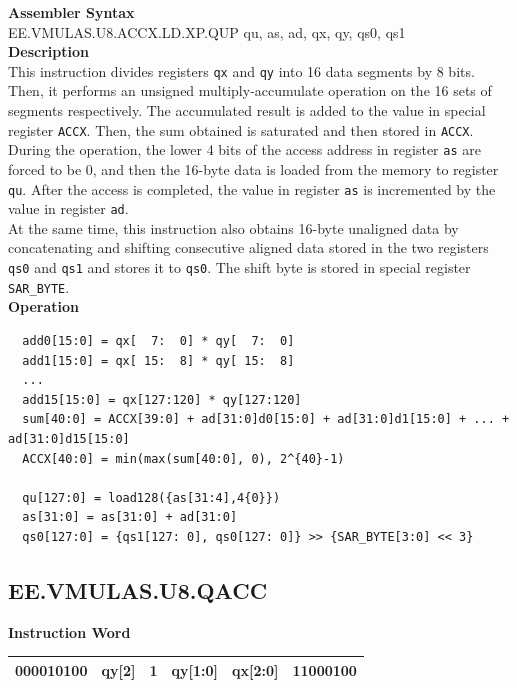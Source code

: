 \textbf{Assembler Syntax} \\
EE.VMULAS.U8.ACCX.LD.XP.QUP qu, as, ad, qx, qy, qs0, qs1 \\
\textbf{Description} \\
This instruction divides registers \lstinline{qx} and \lstinline{qy} into 16 data segments by 8 bits. Then, it performs an unsigned multiply-accumulate operation on the 16 sets of segments respectively. The accumulated result is added to the value in special register \lstinline{ACCX}. Then, the sum obtained is saturated and then stored in \lstinline{ACCX}.\\
During the operation, the lower 4 bits of the access address in register \lstinline{as} are forced to be 0, and then the 16-byte data is loaded from the memory to register \lstinline{qu}. After the access is completed, the value in register \lstinline{as} is incremented by the value in register \lstinline{ad}.\\
At the same time, this instruction also obtains 16-byte unaligned data by concatenating and shifting consecutive aligned data stored in the two registers \lstinline{qs0} and \lstinline{qs1} and stores it to \lstinline{qs0}. The shift byte is stored in special register \lstinline{SAR_BYTE}.\\
\textbf{Operation}
\begin{lstlisting}
  add0[15:0] = qx[  7:  0] * qy[  7:  0]
  add1[15:0] = qx[ 15:  8] * qy[ 15:  8]
  ...
  add15[15:0] = qx[127:120] * qy[127:120]
  sum[40:0] = ACCX[39:0] + ad[31:0]d0[15:0] + ad[31:0]d1[15:0] + ... + ad[31:0]d15[15:0]
  ACCX[40:0] = min(max(sum[40:0], 0), 2^{40}-1)

  qu[127:0] = load128({as[31:4],4{0}})
  as[31:0] = as[31:0] + ad[31:0]
  qs0[127:0] = {qs1[127: 0], qs0[127: 0]} >> {SAR_BYTE[3:0] << 3}
\end{lstlisting}

\clearpage
\subsection{EE.VMULAS.U8.QACC}\label{instruction:EEVMULASU8QACC}
\setlength\tabcolsep{6pt}
\textbf{Instruction Word} \\
\begin{tabular}{|c|c|c|c|c|c|}
	\hline
	000010100 & qy[2] & 1 & qy[1:0] & qx[2:0] & 11000100 \\
	\hline
\end{tabular}

